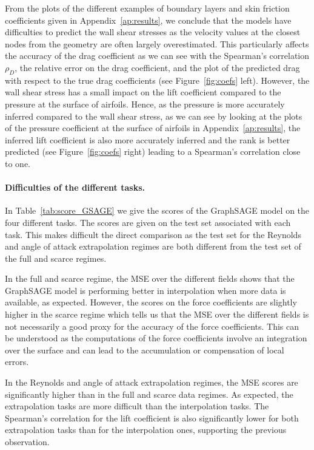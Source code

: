 From the plots of the different examples of boundary layers and skin friction coefficients given in Appendix~\ref{ap:results}, we conclude that the models have difficulties to predict the wall shear stresses as the velocity values at the closest nodes from the geometry are often largely overestimated. This particularly affects the accuracy of the drag coefficient as we can see with the Spearman's correlation $\rho_D$, the relative error on the drag coefficient, and the plot of the predicted drag with respect to the true drag coefficients (see Figure~\ref{fig:coefs} left). However, the wall shear stress has a small impact on the lift coefficient compared to the pressure at the surface of airfoils. Hence, as the pressure is more accurately inferred compared to the wall shear stress, as we can see by looking at the plots of the pressure coefficient at the surface of airfoils in Appendix~\ref{ap:results}, the inferred lift coefficient is also more accurately inferred and the rank is better predicted (see Figure~\ref{fig:coefs} right) leading to a Spearman's correlation close to one.

\paragraph{Difficulties of the different tasks.} In Table~\ref{tab:score_GSAGE} we give the scores of the GraphSAGE model on the four different tasks. The scores are given on the test set associated with each task. This makes difficult the direct comparison as the test set for the Reynolds and angle of attack extrapolation regimes are both different from the test set of the full and scarce regimes.

In the full and scarce regime, the MSE over the different fields shows that the GraphSAGE model is performing better in interpolation when more data is available, as expected. However, the scores on the force coefficients are slightly higher in the scarce regime which tells us that the MSE over the different fields is not necessarily a good proxy for the accuracy of the force coefficients. This can be understood as the computations of the force coefficients involve an integration over the surface and can lead to the accumulation or compensation of local errors.

In the Reynolds and angle of attack extrapolation regimes, the MSE scores are significantly higher than in the full and scarce data regimes. As expected, the extrapolation tasks are more difficult than the interpolation tasks. The Spearman's correlation for the lift coefficient is also significantly lower for both extrapolation tasks than for the interpolation ones, supporting the previous observation.

